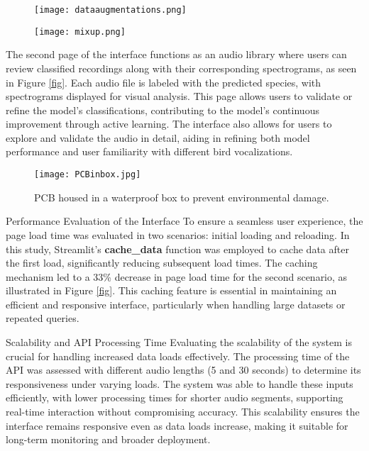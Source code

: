 \begin{figure}[h!]
    \centering
    \begin{minipage}{.5\textwidth}
        \centering
        \texttt{[image: dataaugmentations.png]}
        \label{fig:augmentation}
    \end{minipage}
    \begin{minipage}{.5\textwidth}
        \centering
        \texttt{[image: mixup.png]}
        \label{fig:augmentation}
    \end{minipage}
    \caption{}
    \label{fig:augmentation}
\end{figure}


The second page of the interface functions as an audio library where users can review classified recordings along with their corresponding spectrograms, as seen in Figure \ref{fig}. Each audio file is labeled with the predicted species, with spectrograms displayed for visual analysis. This page allows users to validate or refine the model’s classifications, contributing to the model’s continuous improvement through active learning. The interface also allows for users to explore and validate the audio in detail, aiding in refining both model performance and user familiarity with different bird vocalizations.

\begin{figure}[h]
    \centering
    \texttt{[image: PCBinbox.jpg]}
    \caption{PCB housed in a waterproof box to prevent environmental damage.}
    \vspace{0.1cm}
    \label{fig:pcb_box}
\end{figure}

Performance Evaluation of the Interface
To ensure a seamless user experience, the page load time was evaluated in two scenarios: initial loading and reloading. In this study, Streamlit’s \textbf{cache_data} function was employed to cache data after the first load, significantly reducing subsequent load times. The caching mechanism led to a 33\% decrease in page load time for the second scenario, as illustrated in Figure \ref{fig}. This caching feature is essential in maintaining an efficient and responsive interface, particularly when handling large datasets or repeated queries.

Scalability and API Processing Time
Evaluating the scalability of the system is crucial for handling increased data loads effectively. The processing time of the API was assessed with different audio lengths (5 and 30 seconds) to determine its responsiveness under varying loads. The system was able to handle these inputs efficiently, with lower processing times for shorter audio segments, supporting real-time interaction without compromising accuracy. This scalability ensures the interface remains responsive even as data loads increase, making it suitable for long-term monitoring and broader deployment.



